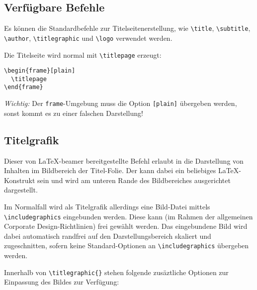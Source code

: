 \subsection{Verfügbare Befehle}

Es können die Standardbefehle zur Titelseitenerstellung, wie
\lstinline{\title},
\lstinline{\subtitle},
\lstinline{\author},
\lstinline{\titlegraphic}
und \lstinline{\logo} verwendet werden.

Die Titelseite wird normal mit \lstinline{\titlepage} erzeugt:

\begin{lstlisting}
\begin{frame}[plain]
  \titlepage
\end{frame}
\end{lstlisting}

\emph{Wichtig:} Der \lstinline{frame}-Umgebung muss die Option
\lstinline{[plain]} übergeben werden,
sonst kommt es zu einer falschen Darstellung!

\subsection{Titelgrafik}

\begin{Declaration}
\end{Declaration}

\begin{sloppypar}
Dieser von \LaTeX-beamer bereitgestellte Befehl erlaubt in \tubslatex
die Darstellung von Inhalten im Bildbereich der Titel-Folie.
Der  kann dabei ein beliebiges \LaTeX-Konstrukt sein
und wird am unteren Rande des Bildbereiches ausgerichtet dargestellt.

Im Normalfall wird als Titelgrafik allerdings eine Bild-Datei mittels
\lstinline{\includegraphics} eingebunden werden.
Diese kann (im Rahmen der allgemeinen Corporate Design-Richtlinien)
frei gewählt werden.
Das eingebundene Bild wird dabei automatisch randfrei
auf den Darstellungsbereich skaliert und zugeschnitten, sofern keine
Standard-Optionen an \lstinline{\includegraphics} übergeben werden.

Innerhalb von \lstinline!\titlegraphic{}! stehen folgende
zusäztliche Optionen zur Einpassung des Bildes zur Verfügung:
\end{sloppypar}

\begin{desctable}
\end{desctable}


